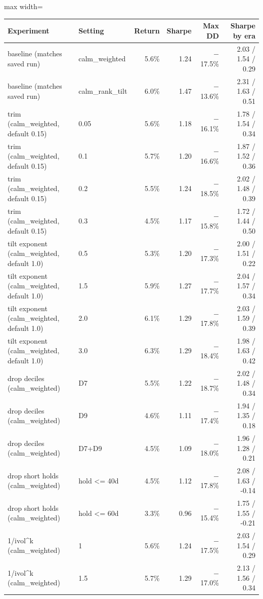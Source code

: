 {\footnotesize
\begin{adjustbox}{max width=\linewidth}
\begin{tabular}{llrrrr}
\toprule
Experiment & Setting & Return & Sharpe & Max DD & Sharpe by era \\
\midrule
baseline (matches saved run) & calm\_weighted & 5.6\% & 1.24 & $-$17.5\% & 2.03 / 1.54 / 0.29 \\
baseline (matches saved run) & calm\_rank\_tilt & 6.0\% & 1.47 & $-$13.6\% & 2.31 / 1.63 / 0.51 \\
\midrule
trim (calm\_weighted, default 0.15) & 0.05 & 5.6\% & 1.18 & $-$16.1\% & 1.78 / 1.54 / 0.34 \\
trim (calm\_weighted, default 0.15) & 0.1 & 5.7\% & 1.20 & $-$16.6\% & 1.87 / 1.52 / 0.36 \\
trim (calm\_weighted, default 0.15) & 0.2 & 5.5\% & 1.24 & $-$18.5\% & 2.02 / 1.48 / 0.39 \\
trim (calm\_weighted, default 0.15) & 0.3 & 4.5\% & 1.17 & $-$15.8\% & 1.72 / 1.44 / 0.50 \\
\midrule
tilt exponent (calm\_weighted, default 1.0) & 0.5 & 5.3\% & 1.20 & $-$17.3\% & 2.00 / 1.51 / 0.22 \\
tilt exponent (calm\_weighted, default 1.0) & 1.5 & 5.9\% & 1.27 & $-$17.7\% & 2.04 / 1.57 / 0.34 \\
tilt exponent (calm\_weighted, default 1.0) & 2.0 & 6.1\% & 1.29 & $-$17.8\% & 2.03 / 1.59 / 0.39 \\
tilt exponent (calm\_weighted, default 1.0) & 3.0 & 6.3\% & 1.29 & $-$18.4\% & 1.98 / 1.63 / 0.42 \\
\midrule
drop deciles (calm\_weighted) & D7 & 5.5\% & 1.22 & $-$18.7\% & 2.02 / 1.48 / 0.34 \\
drop deciles (calm\_weighted) & D9 & 4.6\% & 1.11 & $-$17.4\% & 1.94 / 1.35 / 0.18 \\
drop deciles (calm\_weighted) & D7+D9 & 4.5\% & 1.09 & $-$18.0\% & 1.96 / 1.28 / 0.21 \\
\midrule
drop short holds (calm\_weighted) & hold <= 40d & 4.5\% & 1.12 & $-$17.8\% & 2.08 / 1.63 / -0.14 \\
drop short holds (calm\_weighted) & hold <= 60d & 3.3\% & 0.96 & $-$15.4\% & 1.75 / 1.55 / -0.21 \\
\midrule
1/ivol\^{}k (calm\_weighted) & 1 & 5.6\% & 1.24 & $-$17.5\% & 2.03 / 1.54 / 0.29 \\
1/ivol\^{}k (calm\_weighted) & 1.5 & 5.7\% & 1.29 & $-$17.0\% & 2.13 / 1.56 / 0.34 \\

\end{tabular}
\end{adjustbox}}
